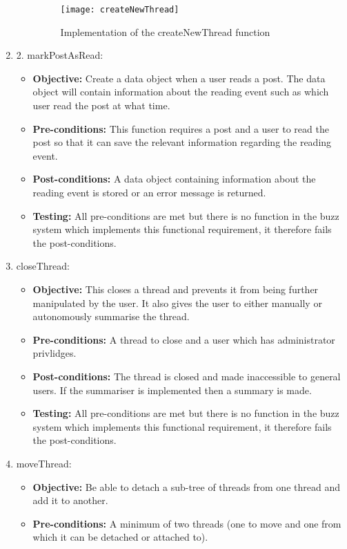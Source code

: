 \begin{enumerate}
\begin{itemize}
\begin{figure}[h!]
  \centering
    \texttt{[image: createNewThread]}
    \caption{Implementation of the createNewThread function}
\end{figure}
	\end{itemize}
\item 2.	markPostAsRead:
	\begin{itemize}
		\item\textbf{Objective: } Create a data object when a user reads a post. The data object will contain information about the reading event such as which user read the post at what time.
		\item\textbf{Pre-conditions: } This function requires a post and a user to read the post so that it can save the relevant information regarding the reading event.
		\item\textbf{Post-conditions: } A data object containing information about the reading event is stored or an error message is returned.
		\item\textbf{Testing: } All pre-conditions are met but there is no function in the buzz system which implements this functional requirement, it therefore fails the post-conditions.
	\end{itemize}
\item closeThread:
	\begin{itemize}
		\item\textbf{Objective: }This closes a thread and prevents it from being further manipulated by the user. It also gives the user to either manually or autonomously summarise the thread.
		\item\textbf{Pre-conditions: } A thread to close and a user which has administrator privlidges.
		\item\textbf{Post-conditions: } The thread is closed and made inaccessible  to general users. If the summariser is implemented then a summary is made.
		\item\textbf{Testing: } All pre-conditions are met but there is no function in the buzz system which implements this functional requirement, it therefore fails the post-conditions.
	\end{itemize}
\item moveThread:
	\begin{itemize}
		\item\textbf{Objective: }  Be able to detach a sub-tree of threads from one thread and add it to another.
		\item\textbf{Pre-conditions: } A minimum of two threads (one to move and one from which it can be detached or attached to).

\end{itemize}
\end{enumerate}
